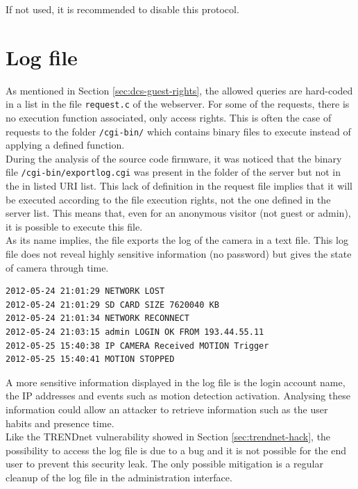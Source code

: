 If not used, it is recommended to disable this protocol.

\section{Log file}
\label{sec:dcs-log}

As mentioned in Section \ref{sec:dcs-guest-rights}, the allowed queries are hard-coded in a list in the file \texttt{request.c} of the webserver.
For some of the requests, there is no execution function associated, only access rights.
This is often the case of requests to the folder \texttt{/cgi-bin/} which contains binary files to execute instead of applying a defined function.\\

During the analysis of the source code firmware, it was noticed that the binary file \texttt{/cgi-bin/exportlog.cgi} was present in the folder of the server but not in the in listed URI list.
This lack of definition in the request file implies that it will be executed according to the file execution rights, not the one defined in the server list.
This means that, even for an anonymous visitor (not guest or admin), it is possible to execute this file.\\

As its name implies, the file exports the log of the camera in a text file.
This log file does not reveal highly sensitive information (no password) but gives the state of camera through time.

\begin{verbatim}
2012-05-24 21:01:29 NETWORK LOST
2012-05-24 21:01:29 SD CARD SIZE 7620040 KB
2012-05-24 21:01:34 NETWORK RECONNECT
2012-05-24 21:03:15 admin LOGIN OK FROM 193.44.55.11
2012-05-25 15:40:38 IP CAMERA Received MOTION Trigger
2012-05-25 15:40:41 MOTION STOPPED
\end{verbatim}

A more sensitive information displayed in the log file is the login account name, the IP addresses and events such as motion detection activation.
Analysing these information could allow an attacker to retrieve information such as the user habits and presence time.\\

Like the TRENDnet vulnerability showed in Section \ref{sec:trendnet-hack}, the possibility to access the log file is due to a bug and it is not possible for the end user to prevent this security leak.
The only possible mitigation is a regular cleanup of the log file in the administration interface.

